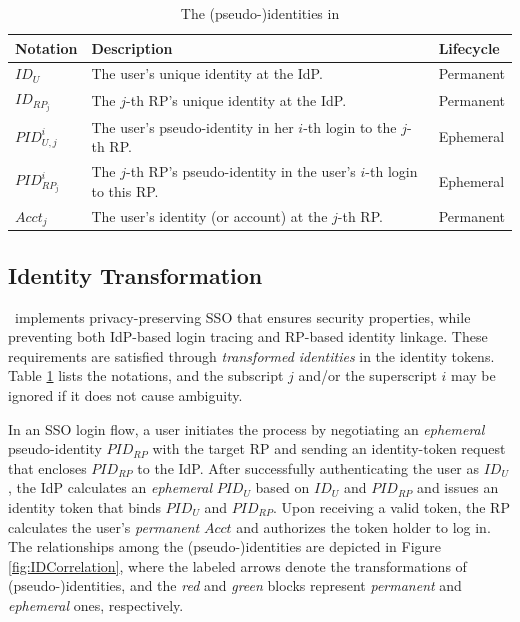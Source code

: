 \begin{table}[b]
\footnotesize
    \caption{The (pseudo-)identities in \usso}
    \centering
    \begin{tabular}{|p{0.93cm}|p{5.16cm}|p{1.13cm}|} \hline
    {\textbf{Notation}} & {\textbf{Description}} & {\textbf{Lifecycle}} \\ \hline
    {$ID_U$} & {The user's unique identity at the IdP.} & {Permanent} \\ \hline
    {$ID_{RP_j}$} & {The $j$-th RP's unique identity at the IdP.} & {Permanent} \\ \hline
    {$PID_{U,j}^i$} & {The user's pseudo-identity in her $i$-th login to the $j$-th RP.} & {Ephemeral} \\ \hline
    {$PID_{RP_j}^i$} & {The $j$-th RP's pseudo-identity in the user's $i$-th login to this RP.} & {Ephemeral} \\ \hline
    {$Acct_j$} & {The user's identity (or account) at the $j$-th RP.} & {Permanent} \\ \hline
    \end{tabular}
    \label{tbl:notations-dilemma}
\end{table}

\subsection{Identity Transformation}
\label{subsec:solutions}

\usso\ implements privacy-preserving SSO that ensures security properties, while preventing both IdP-based login tracing and RP-based identity linkage.
These requirements are satisfied through \emph{transformed identities} in the identity tokens. Table \ref{tbl:notations-dilemma} lists the notations,
and the subscript $j$ and/or the superscript $i$ may be ignored if it does not cause ambiguity.


In an SSO login flow, a user initiates the process by negotiating an \emph{ephemeral} pseudo-identity $PID_{RP}$  with the target RP and sending an identity-token request that encloses $PID_{RP}$ to the IdP.
After successfully authenticating the user as $ID_U$, the IdP calculates an \emph{ephemeral} $PID_U$ based on $ID_U$ and $PID_{RP}$ and issues an identity token that binds $PID_U$ and $PID_{RP}$. Upon receiving a valid token, the RP calculates the user's \emph{permanent} $Acct$ and authorizes the token holder to log in.
The relationships among the (pseudo-)identities are depicted in Figure \ref{fig:IDCorrelation}, where the labeled arrows denote the transformations of (pseudo-)identities, and the \emph{red} and \emph{green} blocks represent \emph{permanent} and \emph{ephemeral} ones, respectively.

